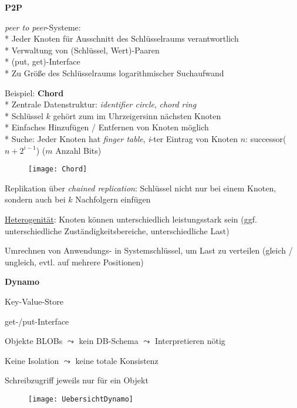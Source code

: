 \newpage

\textbf{P2P}
\begin{items}
	\item \emph{peer to peer}-Systeme:
		\\*
		Jeder Knoten für Ausschnitt des Schlüsselraums verantwortlich
		\\*
		Verwaltung von (Schlüssel, Wert)-Paaren
		\\*
		(put, get)-Interface
		\\*
		Zu Größe des Schlüsselraums logarithmischer Suchaufwand
	\item Beispiel: \textbf{Chord} \\*
		Zentrale Datenstruktur: \emph{identifier circle}, \emph{chord ring}\\*
		Schlüssel $k$ gehört zum im Uhrzeigersinn nächsten Knoten\\*
		Einfaches Hinzufügen / Entfernen von Knoten möglich
		\\* Suche: Jeder Knoten hat \emph{finger table}, \emph{i}-ter Eintrag von Knoten \( n \): successor(\( n+2^{i-1} \)) (\( m \) Anzahl Bits)
	\begin{figure}[H]\centering\label{Chord}\texttt{[image: Chord]}\end{figure}
	\item Replikation über \emph{chained replication}: Schlüssel nicht nur bei einem Knoten, sondern auch bei \( k \) Nachfolgern einfügen
	\item \underline{Heterogenität}: Knoten können unterschiedlich leistungsstark sein (ggf. unterschiedliche Zuständigkeitsbereiche, unterschiedliche Last)
	\item Umrechnen von Anwendungs- in Systemschlüssel, um Last zu verteilen (gleich / ungleich, evtl. auf mehrere Positionen)
\end{items}

\textbf{Dynamo}
\begin{items}
	\item Key-Value-Store
	\item get-/put-Interface
	\item Objekte BLOBs \( \leadsto \) kein DB-Schema \( \leadsto \) Interpretieren nötig
	\item Keine Isolation \( \leadsto \) keine totale Konsistenz
	\item Schreibzugriff jeweils nur für ein Objekt
\end{items}
\begin{figure}[H]\centering\label{UebersichtDynamo}\texttt{[image: UebersichtDynamo]}\end{figure}

